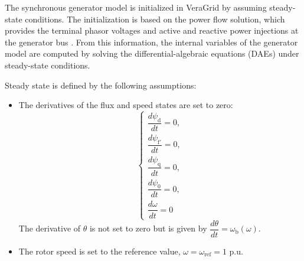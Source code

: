 The synchronous generator model is initialized in VeraGrid by assuming steady-state conditions. The initialization is based on
the power flow solution, which provides the terminal phasor voltages and active and reactive power injections at the generator bus \cite{UPC_2023EMTInitialization}. From this information,
the internal variables of the generator model are computed by solving the differential-algebraic equations (DAEs) under steady-state conditions.

Steady state is defined by the following assumptions:
\begin{itemize}
    \item The derivatives of the flux and speed states are set to zero:
    \begin{equation}
    \begin{cases}
    \dfrac{d \psi_\text{d}}{dt} = 0, \\
    \dfrac{d \psi_{\text{f}'}}{dt} = 0, \\ 
    \dfrac{d \psi_\text{q}}{dt} = 0, \\  
    \dfrac{d \psi_\text{0}}{dt} = 0, \\  
    \dfrac{d \omega}{dt} = 0
    \end{cases}
    \end{equation}
    The derivative of $\theta$ is not set to zero but is given by $\dfrac{d \theta}{dt} = \omega_\text{b} (\omega)$.
    \item The rotor speed is set to the reference value, $\omega = \omega_{\text{ref}} = 1$ p.u.
\end{itemize}

